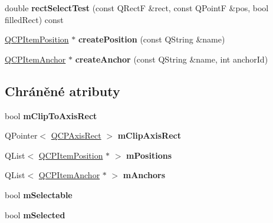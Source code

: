 \begin{DoxyCompactItemize}
\item 
\hypertarget{classQCPAbstractItem_a4c0e14c4e92df91174cb7183fb363069}{}double {\bfseries rect\+Select\+Test} (const Q\+Rect\+F \&rect, const Q\+Point\+F \&pos, bool filled\+Rect) const \label{classQCPAbstractItem_a4c0e14c4e92df91174cb7183fb363069}

\item 
\hypertarget{classQCPAbstractItem_a75036d39c4d4e2e1a7dd145fff915d32}{}\hyperlink{classQCPItemPosition}{Q\+C\+P\+Item\+Position} $\ast$ {\bfseries create\+Position} (const Q\+String \&name)\label{classQCPAbstractItem_a75036d39c4d4e2e1a7dd145fff915d32}

\item 
\hypertarget{classQCPAbstractItem_af3fc92527802078ca395138748b629a7}{}\hyperlink{classQCPItemAnchor}{Q\+C\+P\+Item\+Anchor} $\ast$ {\bfseries create\+Anchor} (const Q\+String \&name, int anchor\+Id)\label{classQCPAbstractItem_af3fc92527802078ca395138748b629a7}

\end{DoxyCompactItemize}
\subsection*{Chráněné atributy}
\begin{DoxyCompactItemize}
\item 
\hypertarget{classQCPAbstractItem_ad2a70ff6b658fcb84a9427f69d3f587d}{}bool {\bfseries m\+Clip\+To\+Axis\+Rect}\label{classQCPAbstractItem_ad2a70ff6b658fcb84a9427f69d3f587d}

\item 
\hypertarget{classQCPAbstractItem_a3e57cfe7da4b1ac3d6fa7281ea437361}{}Q\+Pointer$<$ \hyperlink{classQCPAxisRect}{Q\+C\+P\+Axis\+Rect} $>$ {\bfseries m\+Clip\+Axis\+Rect}\label{classQCPAbstractItem_a3e57cfe7da4b1ac3d6fa7281ea437361}

\item 
\hypertarget{classQCPAbstractItem_af94ff71b6a15ea6d028ab8bd8eccd012}{}Q\+List$<$ \hyperlink{classQCPItemPosition}{Q\+C\+P\+Item\+Position} $\ast$ $>$ {\bfseries m\+Positions}\label{classQCPAbstractItem_af94ff71b6a15ea6d028ab8bd8eccd012}

\item 
\hypertarget{classQCPAbstractItem_a909a3abab783de302ebf0a0e6f2bbc15}{}Q\+List$<$ \hyperlink{classQCPItemAnchor}{Q\+C\+P\+Item\+Anchor} $\ast$ $>$ {\bfseries m\+Anchors}\label{classQCPAbstractItem_a909a3abab783de302ebf0a0e6f2bbc15}

\item 
\hypertarget{classQCPAbstractItem_ad81eb35c8726a0f458db9df9732e0e41}{}bool {\bfseries m\+Selectable}\label{classQCPAbstractItem_ad81eb35c8726a0f458db9df9732e0e41}

\item 
\hypertarget{classQCPAbstractItem_a4bdb3457dad1d268c0f78a44152b9645}{}bool {\bfseries m\+Selected}\label{classQCPAbstractItem_a4bdb3457dad1d268c0f78a44152b9645}

\end{DoxyCompactItemize}
